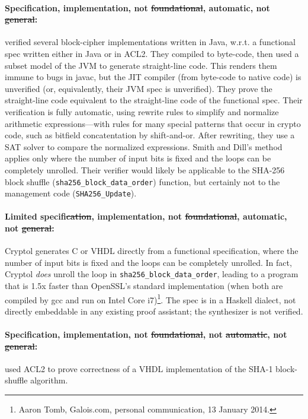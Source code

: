\documentclass[prodmode,acmtoplas]{acmsmall}
\begin{document}
\paragraph{Specification, implementation, not \st{foundational}, automatic, not \st{general}:}
 verified several block-cipher implementations
written in Java, w.r.t. a functional spec written either in Java or in ACL2.
They compiled to byte-code, then 
used a subset model of the JVM to generate straight-line code.
This renders them immune to bugs in \textsf{javac},
but the JIT compiler (from byte-code to native code) is unverified
(or, equivalently, their JVM spec is unverified).
They prove the straight-line code equivalent to the straight-line code
of the functional spec.
Their verification is fully automatic, using rewrite rules to simplify
and normalize arithmetic expressions---with rules for many special patterns that
occur in crypto code, such as bitfield concatentation by shift-and-or.
After rewriting, they use a SAT solver to compare the normalized expressions.
Smith and Dill's method applies only where the number of input bits is fixed
and the loops can be completely unrolled.  Their verifier would likely be applicable
to the SHA-256 block shuffle (\lstinline{sha256_block_data_order}) function, but certainly not
to the management code (\lstinline{SHA256_Update}).

\paragraph{Limited specif\st{ication}, implementation,  not \st{foundational}, automatic, not \st{general}:}
Cryptol \cite{erkok2009hardware} generates C or
VHDL directly from a functional specification,
where the number of input bits is fixed
and the loops can be completely unrolled. 
In fact, Cryptol \emph{does} unroll the loop in 
\lstinline{sha256_block_data_order},
leading to a program that is 1.5x faster than OpenSSL's standard
implementation (when both are compiled by gcc and run on Intel Core i7)\footnote{
Aaron Tomb, Galois.com, personal communication, 13 January 2014.}.
The spec is in a Haskell dialect, not directly embeddable in any
existing proof assistant; the synthesizer is not verified.

\paragraph{Specification, implementation, not \st{foundational}, not \st{automatic}, not \st{general}:}
used ACL2 to prove correctness of a VHDL implementation of the SHA-1
block-shuffle algorithm.
\end{document}
